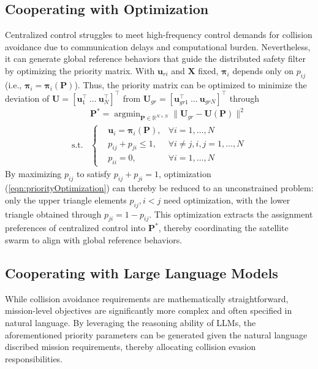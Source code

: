 \documentclass{ifacconf}
\begin{document}
\subsection{Cooperating with Optimization}
\par Centralized control struggles to meet high-frequency control demands for collision avoidance due to communication delays and computational burden.
Nevertheless, it can generate global reference behaviors that guide the distributed safety filter by optimizing the priority matrix.
With $\boldsymbol{u}_{ri}$ and $\boldsymbol{X}$ fixed, $\boldsymbol{\pi}_i$ depends only on $p_{ij}$ (i.e., $\boldsymbol{\pi}_i = \boldsymbol{\pi}_i (\boldsymbol{P})$). Thus, the priority matrix can be optimized to minimize the deviation of $\boldsymbol{U} = [\boldsymbol{u}_1^\top~\dots~\boldsymbol{u}_N^\top]^\top$ from $\boldsymbol{U}_{gr} = [\boldsymbol{u}_{gr1}^{\top}~\dots~\boldsymbol{u}_{grN}]^\top$ through
\begin{equation}\label{eqn:priorityOptimization}
\begin{aligned}
      & \boldsymbol{P}^{\ast} = \mathop{\arg \min}_{\boldsymbol{P} \in \mathbb{R}^{N\times N}} \| \boldsymbol{U}_{gr} - \boldsymbol{U}(\boldsymbol{P}) \|^2 \\
      \mathrm{s.t.}& \left\{ 
         \begin{aligned}
            &\boldsymbol{u}_i =  \boldsymbol{\pi}_i(\boldsymbol{P}), &\forall i = 1, \dots, N\\
            &p_{ij} + p_{ji} \le 1, &\forall i \neq j, i, j = 1, \dots, N\\
            &p_{ii} = 0, &\forall i = 1, \dots, N
         \end{aligned}   
      \right.
\end{aligned}
\end{equation}
By maximizing $p_{ij}$ to satisfy $p_{ij} + p_{ji} = 1$, optimization (\ref{eqn:priorityOptimization}) can thereby be reduced to an unconstrained problem: only the upper triangle elements $p_{ij}, i < j$ need optimization, with the lower triangle obtained through $p_{ji} = 1 - p_{ij}$.
This optimization extracts the assignment preferences of centralized control into $\boldsymbol{P}^{\ast}$, thereby coordinating the satellite swarm to align with global reference behaviors.

\subsection{Cooperating with Large Language Models}
\par While collision avoidance requirements are mathematically straightforward, mission-level objectives are significantly more complex and often specified in natural language. 
By leveraging the reasoning ability of LLMs, the aforementioned priority parameters can be generated given the natural language discribed mission requirements, thereby allocating collision evasion responsibilities. 
\end{document}
